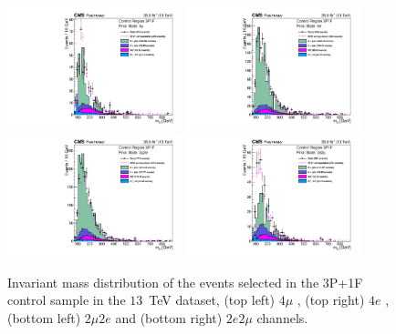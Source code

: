 \begin{figure}[!htb]
\begin{center}
    {\includegraphics [width=0.45\textwidth] {Figures/RedBkg/HZZ_3P1Fuw_ZZMass_4m.pdf}}
    {\includegraphics [width=0.45\textwidth] {Figures/RedBkg/HZZ_3P1Fuw_ZZMass_4e.pdf}} \\
    {\includegraphics [width=0.45\textwidth] {Figures/RedBkg/HZZ_3P1Fuw_ZZMass_2m2e.pdf}}
    {\includegraphics [width=0.45\textwidth] {Figures/RedBkg/HZZ_3P1Fuw_ZZMass_2e2m.pdf}} \\
\caption{
Invariant mass distribution of the events selected in the 3P+1F control sample in the
$13$~TeV dataset, (top left)  $4\mu$ , (top right) $4e$ , (bottom left)  $2\mu2e$ and (bottom right)  $2e2\mu$ channels.
}
\label{fig:CR_3P1F}
\end{center}
\end{figure}


